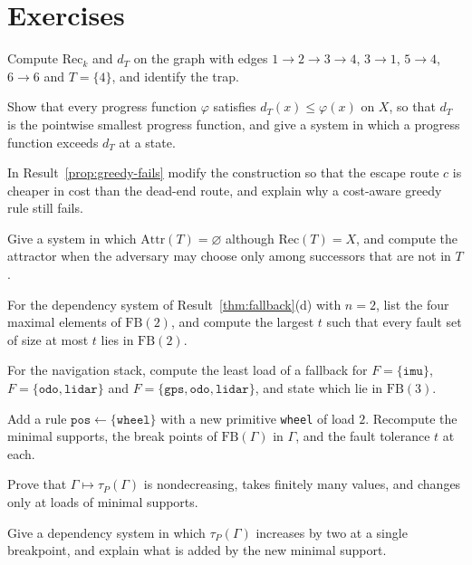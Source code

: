 \section*{Exercises}

\begin{exercise}
Compute $\mathrm{Rec}_k$ and $d_T$ on the graph with edges $1\to2\to3\to4$, $3\to1$, $5\to4$, $6\to6$ and $T=\{4\}$, and identify the trap.
\end{exercise}

\begin{exercise}
Show that every progress function $\varphi$ satisfies $d_T(x)\le\varphi(x)$ on $X$, so that $d_T$ is the pointwise smallest progress function, and give a system in which a progress function exceeds $d_T$ at a state.
\end{exercise}

\begin{exercise}
In Result~\ref{prop:greedy-fails} modify the construction so that the escape route $c$ is cheaper in cost than the dead-end route, and explain why a cost-aware greedy rule still fails.
\end{exercise}

\begin{exercise}
Give a system in which $\mathrm{Attr}(T)=\varnothing$ although $\mathrm{Rec}(T)=X$, and compute the attractor when the adversary may choose only among successors that are not in $T$.
\end{exercise}

\begin{exercise}
For the dependency system of Result~\ref{thm:fallback}(d) with $n=2$, list the four maximal elements of $\mathrm{FB}(2)$, and compute the largest $t$ such that every fault set of size at most $t$ lies in $\mathrm{FB}(2)$.
\end{exercise}

\begin{exercise}
For the navigation stack, compute the least load of a fallback for $F=\{\texttt{imu}\}$, $F=\{\texttt{odo},\texttt{lidar}\}$ and $F=\{\texttt{gps},\texttt{odo},\texttt{lidar}\}$, and state which lie in $\mathrm{FB}(3)$.
\end{exercise}

\begin{exercise}
Add a rule $\texttt{pos}\leftarrow\{\texttt{wheel}\}$ with a new primitive \texttt{wheel} of load $2$. Recompute the minimal supports, the break points of $\mathrm{FB}(\Gamma)$ in $\Gamma$, and the fault tolerance $t$ at each.\label{ex2:wheel}
\end{exercise}

\begin{exercise}
Prove that $\Gamma\mapsto\tau_P(\Gamma)$ is nondecreasing, takes finitely many values, and changes only at loads of minimal supports.
\end{exercise}

\begin{exercise}
Give a dependency system in which $\tau_P(\Gamma)$ increases by two at a single breakpoint, and explain what is added by the new minimal support.
\end{exercise}

